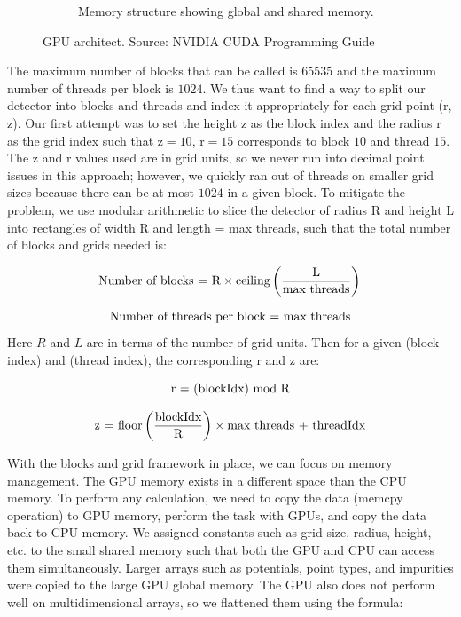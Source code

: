 \begin{figure}
\begin{subfigure}{0.48\textwidth}
 \caption{Memory structure showing global and shared memory.} \label{fig:GPU_basics_b}
 \end{subfigure}
\caption{GPU architect. Source: NVIDIA CUDA {\cpp}  Programming Guide} \label{fig:GPU_basics}
\end{figure}

The maximum number of blocks that can be called is $65535$ and the maximum number of threads per block is $1024$. We thus want to find a way to split our detector into blocks and threads and index it appropriately for each grid point (r, z). Our first attempt was to set the height z as the block index and the radius r as the grid index such that z$=10$, r$=15$ corresponds to block $10$ and thread $15$. The z and r values used are in grid units, so we never run into decimal point issues in this approach; however, we quickly ran out of threads on smaller grid sizes because there can be at most $1024$ in a given block. To mitigate the problem, we use modular arithmetic to slice the detector of radius R and height L into rectangles of width R and length = max threads, such that the total number of blocks and grids needed is:

\begin{equation}{\label{nu_b}}
 \text{Number of blocks = R}\times \text{ceiling} \left( \frac{\text{L}}{\text{max threads}} \right) \\
\end{equation}

\begin{equation}{\label{nu_g}}
 \text{Number of threads per block = max threads}
\end{equation}
Here $R$ and $L$ are in terms of the number of grid units. Then for a given (block index) and (thread index), the corresponding r and z are:

\begin{equation}{\label{r_eq}}
 \text{r = (blockIdx) mod R} \\
\end{equation}

\begin{equation}{\label{z_eq}}
 \text{z = floor}\left(\frac{\text{blockIdx}}{\text{R}}\right) \times \text{max threads + threadIdx}
\end{equation}

With the blocks and grid framework in place, we can focus on memory management. The GPU memory exists in a different space than the CPU memory. To perform any calculation, we need to copy the data (memcpy operation) to GPU memory, perform the task with GPUs, and copy the data back to CPU memory. We assigned constants such as grid size, radius, height, etc. to the small shared memory such that both the GPU and CPU can access them simultaneously. Larger arrays such as potentials, point types, and impurities were copied to the large GPU global memory. The GPU also does not perform well on multidimensional arrays, so we flattened them using the formula:

